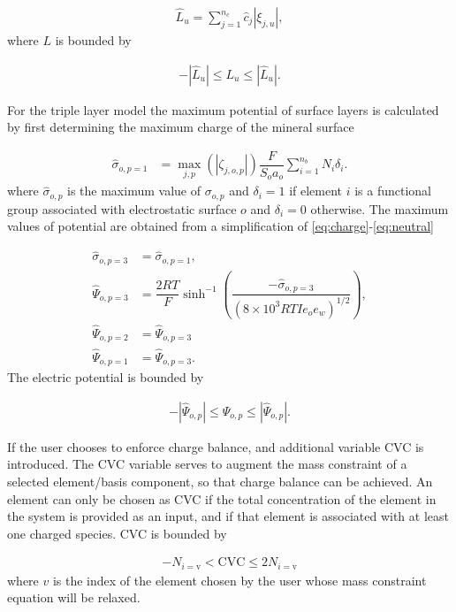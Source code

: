 \documentclass{article}
\begin{document}
\begin{align}
    \hat{L}_u =\sum_{j=1}^{n_c} \hat{c}_j|\xi_{j,u}|, %
\end{align}
where $L$ is bounded by

\begin{align}
    -|\hat{L}_{u}| \leq L_{u} \leq |\hat{L}_{u}|.
\end{align}

For the triple layer model the maximum potential of surface layers is calculated by first determining the maximum charge of the mineral surface

\begin{align}
    \hat{\sigma}_{o,p=1} &= \max_{j,p}(|\zeta_{j,o,p}|)\dfrac{F}{S_o a_o}\sum_{i=1}^{n_b} N_i \delta_i.
\end{align}
where $\hat{\sigma}_{o,p}$ is the maximum value of $\sigma_{o,p}$ and $\delta_i=1$ if element $i$ is a functional group associated with electrostatic surface $o$
and $\delta_i=0$ otherwise. The maximum values of potential are obtained from a simplification of \eqref{eq:charge}-\eqref{eq:neutral}

\begin{align}
    \hat{\sigma}_{o,p=3} &= \hat{\sigma}_{o,p=1},\\
    \hat{\Psi}_{o,p=3} &= \dfrac{2RT}{F}\sinh^{-1}\left(\dfrac{-\hat{\sigma}_{o,p=3}}{(8\times10^3 R T I e_o e_w)^{1/2}}\right),\\
    \hat{\Psi}_{o,p=2} &= \hat{\Psi}_{o,p=3}\\ 
    \hat{\Psi}_{o,p=1} &= \hat{\Psi}_{o,p=3}.
\end{align}
The electric potential is bounded by 

\begin{align}
    -|\hat{\Psi}_{o,p}| \leq \Psi_{o,p} \leq |\hat{\Psi}_{o,p}|.
\end{align}

If the user chooses to enforce charge balance, and additional variable CVC is introduced. The CVC variable serves to augment the mass constraint of a selected element/basis component, so that charge balance can be achieved. An element can only be chosen as CVC if the total concentration of the element in the system is provided as an input, and if that element is associated with at least one charged species. CVC is bounded by 

\begin{align}
    -N_{i=\text{v}} < \text{CVC} \leq 2N_{i=\text{v}}
\end{align}
where $v$ is the index of the element chosen by the user whose mass constraint equation will be relaxed. 
\end{document}
